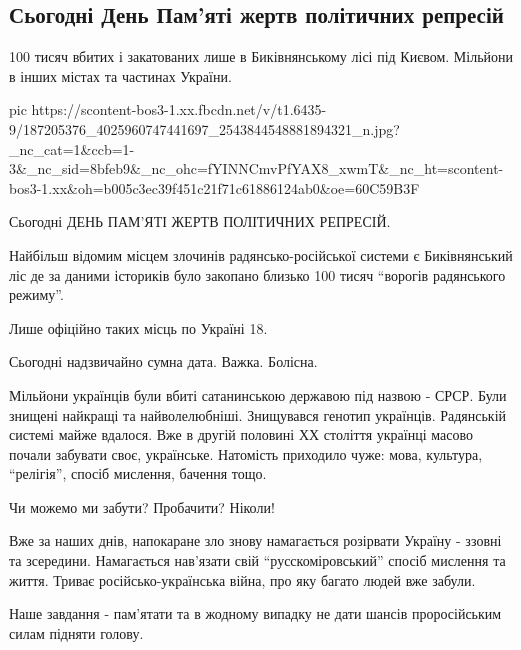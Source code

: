  
 
 
 
 
\subsection{Сьогодні День Пам'яті жертв політичних репресій}
\label{sec:16_05_2021.fb.smolij_andrij.1.den_pamjat_zhertv_polit_repressij}

100 тисяч вбитих і закатованих лише в Биківнянському лісі під Києвом. Мільйони в інших містах та частинах України.

\ifcmt
  pic https://scontent-bos3-1.xx.fbcdn.net/v/t1.6435-9/187205376_4025960747441697_2543844548881894321_n.jpg?_nc_cat=1&ccb=1-3&_nc_sid=8bfeb9&_nc_ohc=fYINNCmvPfYAX8_xwmT&_nc_ht=scontent-bos3-1.xx&oh=b005c3ec39f451c21f71c61886124ab0&oe=60C59B3F
\fi

Сьогодні ДЕНЬ ПАМ'ЯТІ ЖЕРТВ ПОЛІТИЧНИХ РЕПРЕСІЙ.

Найбільш відомим місцем злочинів радянсько-російської системи є Биківнянський
ліс де за даними істориків було закопано близько 100 тисяч \enquote{ворогів радянського
режиму}. 

Лише офіційно таких місць по Україні 18.

Сьогодні надзвичайно сумна дата. Важка. Болісна. 

Мільйони українців були вбиті сатанинською державою під назвою - СРСР. Були
знищені найкращі та найволелюбніші. Знищувався генотип українців. Радянській
системі майже вдалося. Вже в другій половині ХХ століття українці масово почали
забувати своє, українське. Натомість приходило чуже: мова, культура, \enquote{релігія},
спосіб мислення, бачення тощо.

Чи можемо ми забути? Пробачити? Ніколи!

Вже за наших днів, напокаране зло знову намагається розірвати Україну - ззовні
та зсередини. Намагається нав'язати свій \enquote{русскоміровський} спосіб мислення та
життя. Триває російсько-українська війна, про яку багато людей вже забули.

Наше завдання - пам'ятати та в жодному випадку не дати шансів проросійським силам підняти голову. 

